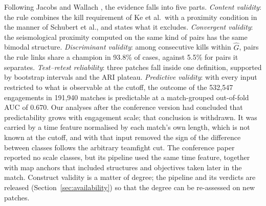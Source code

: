 Following Jacobs and Wallach \cite{jacobs2021measurement}, the evidence falls into five parts.
\emph{Content validity}: the rule combines the kill requirement of Ke et al.\ with a proximity condition in
the manner of Schubert et al., and states what it excludes. \emph{Convergent validity}: the seismological proximity computed on the same kind of
pairs has the same bimodal structure. \emph{Discriminant validity}: among consecutive kills within
$\hat G$, pairs the rule links share a champion in 93.8\% of cases, against 5.5\% for pairs it
separates. \emph{Test--retest reliability}: three patches fall inside one definition, supported by
bootstrap intervals and the ARI plateau. \emph{Predictive validity}: with every input restricted to what
is observable at the cutoff, the outcome of the 532,547 engagements in 191,940 matches is predictable at
a match-grouped out-of-fold AUC of 0.670.
Our analyses after the conference version had concluded that predictability grows with engagement
scale; that conclusion is withdrawn. It was carried by a time feature normalised by each match's own
length, which is not known at the cutoff, and with that input removed the sign of the difference between
classes follows the arbitrary teamfight cut. The conference paper reported no scale classes, but its
pipeline used the same time feature, together with map anchors that included structures and objectives
taken later in the match.
Construct validity is a matter of degree; the pipeline and its verdicts are released
(Section~\ref{sec:availability}) so that the degree can be re-assessed on new patches.
